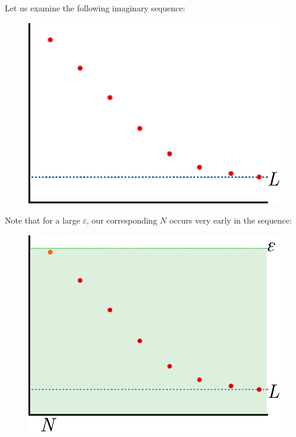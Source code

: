 \begin{ex}
  Let us examine the following imaginary sequence:
  \begin{figure}[H]
    \begin{center}
      \includegraphics[scale=0.5]{continuous/sequence/conv1}
    \end{center}
    \label{fig:conv1}
  \end{figure}
  Note that for a large $\varepsilon$, our corresponding $N$ occurs very early in the sequence:
  \begin{figure}[H]
    \begin{center}
      \includegraphics[scale=0.5]{continuous/sequence/conv2}
    \end{center}

\end{figure}
\end{ex}
